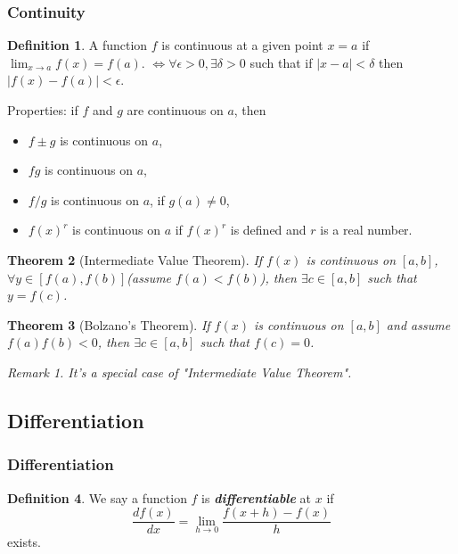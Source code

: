 \documentclass{amsproc}
\newtheorem{theorem}{Theorem}[section]
\theoremstyle{definition}
\newtheorem{definition}[theorem]{Definition}
\theoremstyle{remark}
\newtheorem*{remark*}{Remark}
\numberwithin{equation}{section}
\begin{document}
\subsubsection{Continuity}

\begin{definition}
    A function $f$ is continuous at a given point $x=a$ if $\lim_{x \to a} f(x) = f(a)$. $\iff \forall \epsilon > 0, \exists \delta > 0$ such that if $|x-a|<\delta$ then $|f(x) - f(a)| < \epsilon$.
\end{definition}

Properties: if $f$ and $g$ are continuous on $a$, then
\begin{itemize}
    \item $f \pm g$ is continuous on $a$,
    \item $fg$ is continuous on $a$,
    \item $f / g$ is continuous on $a$, if $g(a) \neq 0$,
    \item $f(x)^{r}$ is continuous on $a$ if $f(x)^{r}$ is defined and $r$ is a real number.
\end{itemize}


\begin{theorem}[Intermediate Value Theorem]
    If $f(x)$ is continuous on $[a,b]$, $\forall y \in [f(a), f(b)]$(assume $f(a) < f(b)$), then $\exists c \in [a,b]$ such that $y=f(c)$.
\end{theorem}

\begin{theorem}[Bolzano's Theorem]
    If $f(x)$ is continuous on $[a,b]$ and assume $f(a)f(b)<0$, then $\exists c \in [a,b]$ such that $f(c) = 0$.
    \begin{remark*}
        It's a special case of "Intermediate Value Theorem".
    \end{remark*}
\end{theorem}

\subsection{Differentiation}

\subsubsection{Differentiation}

\begin{definition}
    We say a function $f$ is \textit{\textbf{differentiable}} at $x$ if
    \begin{equation*}
        \frac{d f(x)}{dx} = \lim_{h \to 0}\frac{f(x+h)-f(x)}{h}
    \end{equation*}
    exists.
\end{definition}
\end{document}
